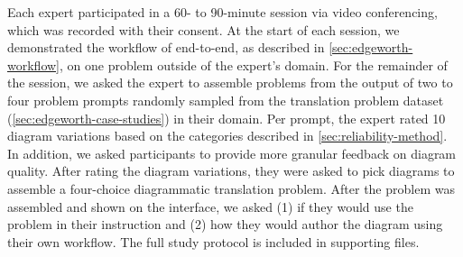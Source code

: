 Each expert participated in a 60- to 90-minute session via video conferencing, which was recorded with their consent. At the start of each session, we demonstrated the workflow of \Edgeworth end-to-end, as described in \cref{sec:edgeworth-workflow}, on one problem outside of the expert's domain. For the remainder of the session, we asked the expert to assemble problems from the \Edgeworth output of two to four problem prompts randomly sampled from the translation problem dataset (\cref{sec:edgeworth-case-studies}) in their domain. Per prompt, the expert rated 10 diagram variations based on the categories described in \cref{sec:reliability-method}. In addition, we asked participants to provide more granular feedback on diagram quality. After rating the diagram variations, they were asked to pick diagrams to assemble a four-choice diagrammatic translation problem. After the problem was assembled and shown on the interface, we asked (1) if they would use the problem in their instruction and (2) how they would author the diagram using their own workflow. The full study protocol is included in supporting files.





